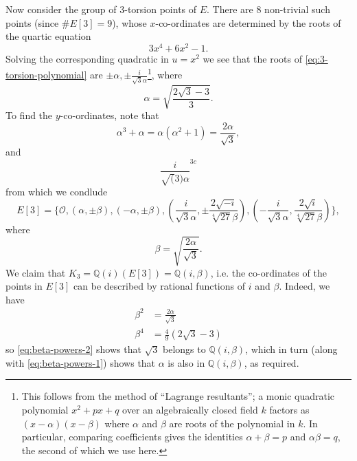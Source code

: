 \documentclass{article}
\theoremstyle{definition}
\begin{document}
Now consider the group of $3$-torsion points of $E$.  There are $8$ non-trivial such
points (since $ \# E[3] = 9$), whose $x$-co-ordinates are determined by the roots of
the quartic equation
\begin{equation}
  \label{eq:3-torsion-polynomial}
  3x^{4} + 6x^{2} - 1.
\end{equation}
Solving the corresponding quadratic in $u = x^{2}$ we see that the roots of
\eqref{eq:3-torsion-polynomial} are $\pm \alpha, \pm
\frac{i}{\sqrt{3}\alpha}$\footnote{This follows from the method of ``Lagrange
  resultants''; a monic quadratic polynomial $x^{2} + px + q$ over an algebraically
  closed field $k$ factors as $(x - \alpha)(x - \beta)$ where $\alpha$ and $\beta$
  are roots of the polynomial in $k$. In particular, comparing coefficients gives the
  identities $\alpha + \beta = p$ and $\alpha \beta = q$, the second of which we use
  here.}, where
\begin{equation*}
  \alpha = \sqrt{ \frac{2\sqrt{3} - 3}{3} }.
\end{equation*}
To find the $y$-co-ordinates, note that
\begin{equation*}
  \alpha^{3} + \alpha = \alpha(\alpha^{2} + 1) = \frac{2\alpha}{\sqrt{3}},
\end{equation*}
and
\begin{equation*}
  \frac{i}{\sqrt(3)\alpha}^{3c}
\end{equation*}
from which we condlude
\begin{equation*}
  E[3] = \{ \mathcal{O}, (\alpha,\pm \beta), (-\alpha, \pm \beta),
  (\frac{i}{\sqrt{3}\alpha}, \pm \frac{2 \sqrt{-i}}{\sqrt[4]{27}\beta} ),
  (-\frac{i}{\sqrt{3}\alpha}, \frac{2 \sqrt{i}}{\sqrt[4]{27}\beta} )  \},
\end{equation*}
where
\begin{equation*}
  \beta = \sqrt{ \frac{2\alpha}{\sqrt{3}} }.
\end{equation*}
We claim that $K_{3} = \mathbb{Q}(i)(E[3]) = \mathbb{Q}(i,\beta)$, i.e. the
co-ordinates of the points in $E[3]$ can be described by rational functions of $i$
and $\beta$. Indeed, we have
\begin{align}
  \beta^{2}&= \frac{2\alpha}{\sqrt{3}} \label{eq:beta-powers-1}\\
  \beta^{4}&= \frac{4}{9}(2\sqrt{3} - 3) \label{eq:beta-powers-2}
\end{align}
so \eqref{eq:beta-powers-2} shows that $\sqrt{3}$ belongs to $\mathbb{Q}(i,\beta)$,
which in turn (along with \eqref{eq:beta-powers-1}) shows that $\alpha$ is also in
$\mathbb{Q}(i,\beta)$, as required.
\end{document}
